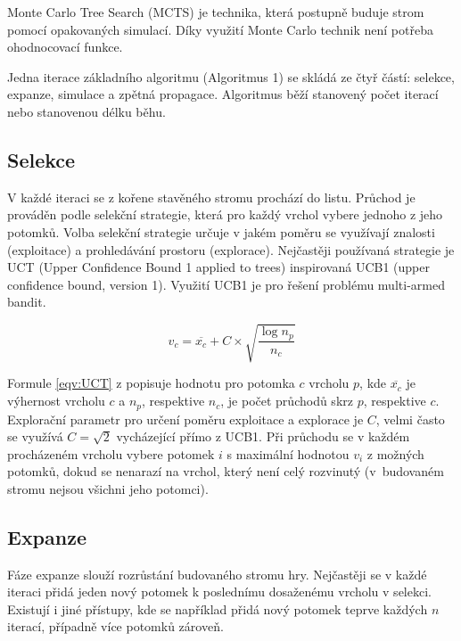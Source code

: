 Monte Carlo Tree Search (MCTS) je technika, která postupně buduje strom pomocí opakovaných simulací. Díky využití Monte Carlo technik není potřeba ohodnocovací funkce. 


Jedna iterace základního algoritmu (Algoritmus 1) se skládá ze čtyř částí: selekce, expanze, simulace a zpětná propagace. Algoritmus běží stanovený počet iterací nebo stanovenou délku běhu.  

\subsection{Selekce}
V každé iteraci se z kořene stavěného stromu prochází do listu. Průchod je prováděn podle selekční strategie, která pro každý vrchol vybere jednoho z jeho potomků. Volba selekční strategie určuje v jakém poměru se využívají znalosti (exploitace) a prohledávání prostoru (explorace). Nejčastěji používaná strategie je UCT (Upper Confidence Bound 1 applied to trees) inspirovaná UCB1 (upper confidence bound, version 1). Využití UCB1 je pro řešení problému multi-armed bandit.

\begin{equation}
    v_c = \overline{x_{c}} + C \times \sqrt{\frac{\log{n_{p}}}{n_{c}}}
\label{eqv:UCT}\end{equation}

Formule \ref{eqv:UCT} z \cite{MultiArmedBandit} popisuje hodnotu pro potomka $c$ vrcholu $p$, kde $\overline{x_c}$ je výhernost vrcholu $c$ a $n_p$, respektive $n_c$, je počet průchodů skrz $p$, respektive $c$. Explorační parametr pro určení poměru exploitace a explorace je $C$, velmi často se využívá $C = \sqrt{2}$ vycházející přímo z UCB1. Při průchodu se v každém procházeném vrcholu vybere potomek $i$ s maximální hodnotou $v_i$ z možných potomků, dokud se nenarazí na vrchol, který není celý rozvinutý (v~budovaném stromu nejsou všichni jeho potomci).

\subsection{Expanze}
Fáze expanze slouží rozrůstání budovaného stromu hry. Nejčastěji se v každé iteraci přidá jeden nový potomek k poslednímu dosaženému vrcholu v selekci. Existují i jiné přístupy, kde se například přidá nový potomek teprve každých $n$ iterací, případně více potomků zároveň.

